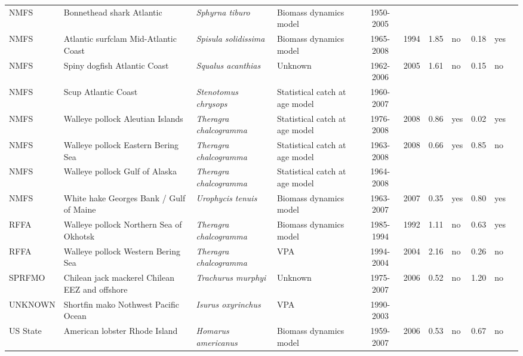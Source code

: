 \begin{longtable}{p{1.8cm}p{3.5cm}p{3.5cm}p{3cm}cccp{0.9cm}cp{0.9cm}c}
  NMFS & Bonnethead shark Atlantic & \textit{Sphyrna tiburo} & Biomass dynamics model & 1950-2005 &  &  &  &  &  & \cite{SmallcoastalAtl2007-SEFSC.pdf} \\ 
  NMFS & Atlantic surfclam Mid-Atlantic Coast & \textit{Spisula solidissima} & Biomass dynamics model & 1965-2008 & 1994 & 1.85 & no & 0.18 & yes & \cite{Surfclam2007.pdf} \\ 
  NMFS & Spiny dogfish Atlantic Coast & \textit{Squalus acanthias} & Unknown & 1962-2006 & 2005 & 1.61 & no & 0.15 & no & \cite{spinydogfish2006.pdf} \\ 
  NMFS & Scup Atlantic Coast & \textit{Stenotomus chrysops} & Statistical catch at age model & 1960-2007 &  &  &  &  &  & \cite{crd0902.pdf} \\ 
  NMFS & Walleye pollock Aleutian Islands & \textit{Theragra chalcogramma} & Statistical catch at age model & 1976-2008 & 2008 & 0.86 & yes & 0.02 & yes & \cite{AFSC-WPOLLAI-2008-Walleye pollock AI.pdf} \\ 
  NMFS & Walleye pollock Eastern Bering Sea & \textit{Theragra chalcogramma} & Statistical catch at age model & 1963-2008 & 2008 & 0.66 & yes & 0.85 & no & \cite{AFSC-WPOLLEBS-2008-Walleye pollock EBS.pdf} \\ 
  NMFS & Walleye pollock Gulf of Alaska & \textit{Theragra chalcogramma} & Statistical catch at age model & 1964-2008 &  &  &  &  &  & \cite{AFSC-WPOLLGA-2008-Walleye pollock GA.pdf} \\ 
  NMFS & White hake Georges Bank / Gulf of Maine & \textit{Urophycis tenuis} & Biomass dynamics model & 1963-2007 & 2007 & 0.35 & yes & 0.80 & yes & \cite{WhiteHake2008.pdf} \\ 
  RFFA & Walleye pollock Northern Sea of Okhotsk & \textit{Theragra chalcogramma} & Biomass dynamics model & 1985-1994 & 1992 & 1.11 & no & 0.63 & yes & \cite{WPOLLNSO-1997-JENSEN.pdf} \\ 
  RFFA & Walleye pollock Western Bering Sea & \textit{Theragra chalcogramma} & VPA & 1994-2004 & 2004 & 2.16 & no & 0.26 & no & \cite{WPOLLWBS-2004-JENSEN.pdf} \\ 
  SPRFMO & Chilean jack mackerel Chilean EEZ and offshore & \textit{Trachurus murphyi} & Unknown & 1975-2007 & 2006 & 0.52 & no & 1.20 & no & \cite{JENSEN-JACKMACKCH-2008.pdf} \\ 
  UNKNOWN & Shortfin mako Nothwest Pacific Ocean & \textit{Isurus oxyrinchus} & VPA & 1990-2003 &  &  &  &  &  & \cite{Chang-Liu-2009-Shortfin-mako-NWPAC.pdf} \\ 
  US State & American lobster Rhode Island & \textit{Homarus americanus} & Biomass dynamics model & 1959-2007 & 2006 & 0.53 & no & 0.67 & no & \cite{NA} \\ 

\end{longtable}
